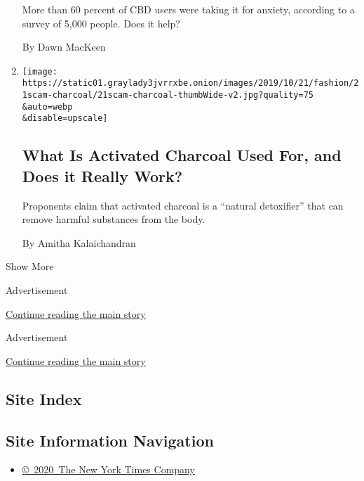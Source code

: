 \begin{enumerate}
  More than 60 percent of CBD users were taking it for anxiety,
  according to a survey of 5,000 people. Does it help?

  By Dawn MacKeen
\item
  \href{/2019/10/16/style/self-care/activated-charcoal-benefits.html}{}

  \texttt{[image: https://static01.graylady3jvrrxbe.onion/images/2019/10/21/fashion/21scam-charcoal/21scam-charcoal-thumbWide-v2.jpg?quality=75\\\&auto=webp\\\&disable=upscale]}

  \hypertarget{what-is-activated-charcoal-used-for-and-does-it-really-work}{%
  \subsection{What Is Activated Charcoal Used For, and Does it Really
  Work?}\label{what-is-activated-charcoal-used-for-and-does-it-really-work}}

  Proponents claim that activated charcoal is a ``natural detoxifier''
  that can remove harmful substances from the body.

  By Amitha Kalaichandran
\end{enumerate}

Show More

Advertisement

\protect\hyperlink{after-mid1}{Continue reading the main story}

Advertisement

\protect\hyperlink{after-mktg}{Continue reading the main story}

\hypertarget{site-index}{%
\subsection{Site Index}\label{site-index}}

\hypertarget{site-information-navigation}{%
\subsection{Site Information
Navigation}\label{site-information-navigation}}

\begin{itemize}
\tightlist
\item
  \href{https://help.nytimes3xbfgragh.onion/hc/en-us/articles/115014792127-Copyright-notice}{©~2020~The
  New York Times Company}
\end{itemize}

